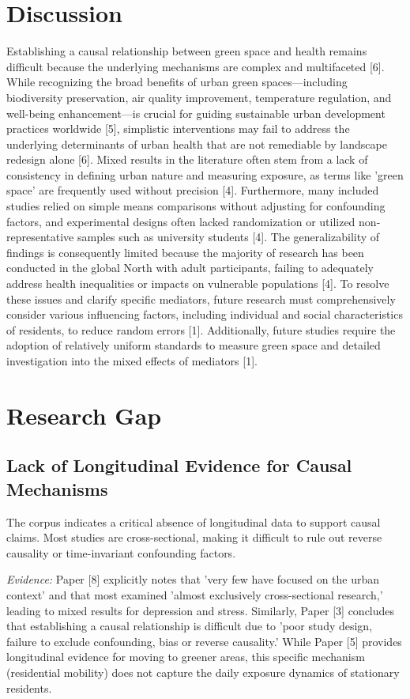 \documentclass[conference]{IEEEtran}
\begin{document}
\section{Discussion}
Establishing a causal relationship between green space and health remains difficult because the underlying mechanisms are complex and multifaceted [6]. While recognizing the broad benefits of urban green spaces—including biodiversity preservation, air quality improvement, temperature regulation, and well-being enhancement—is crucial for guiding sustainable urban development practices worldwide [5], simplistic interventions may fail to address the underlying determinants of urban health that are not remediable by landscape redesign alone [6]. Mixed results in the literature often stem from a lack of consistency in defining urban nature and measuring exposure, as terms like 'green space' are frequently used without precision [4]. Furthermore, many included studies relied on simple means comparisons without adjusting for confounding factors, and experimental designs often lacked randomization or utilized non-representative samples such as university students [4]. The generalizability of findings is consequently limited because the majority of research has been conducted in the global North with adult participants, failing to adequately address health inequalities or impacts on vulnerable populations [4]. To resolve these issues and clarify specific mediators, future research must comprehensively consider various influencing factors, including individual and social characteristics of residents, to reduce random errors [1]. Additionally, future studies require the adoption of relatively uniform standards to measure green space and detailed investigation into the mixed effects of mediators [1].

\section{Research Gap}
\subsection{Lack of Longitudinal Evidence for Causal Mechanisms}
The corpus indicates a critical absence of longitudinal data to support causal claims. Most studies are cross-sectional, making it difficult to rule out reverse causality or time-invariant confounding factors.

\textit{Evidence:} Paper [8] explicitly notes that 'very few have focused on the urban context' and that most examined 'almost exclusively cross-sectional research,' leading to mixed results for depression and stress. Similarly, Paper [3] concludes that establishing a causal relationship is difficult due to 'poor study design, failure to exclude confounding, bias or reverse causality.' While Paper [5] provides longitudinal evidence for moving to greener areas, this specific mechanism (residential mobility) does not capture the daily exposure dynamics of stationary residents.
\end{document}

